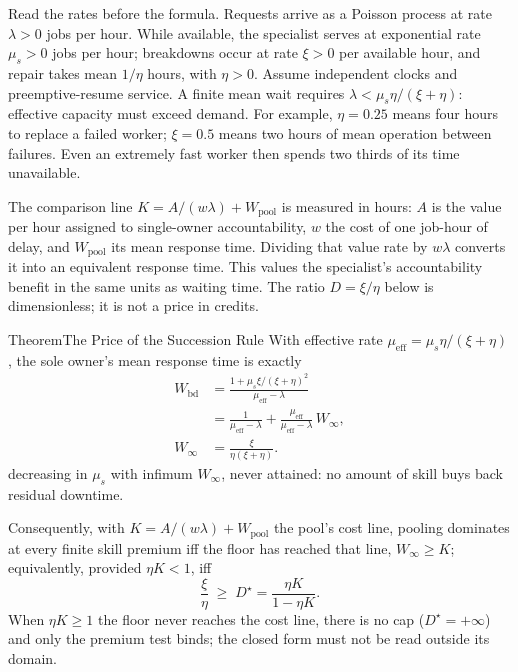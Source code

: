 \documentclass[11pt,a4paper]{article}
\theoremstyle{definition}
\theoremstyle{definition}
\theoremstyle{remark}
\begin{document}
Read the rates before the formula. Requests arrive as a Poisson process at
rate $\lambda>0$ jobs per hour. While available, the specialist serves at
exponential rate $\mu_s>0$ jobs per hour; breakdowns occur at rate $\xi>0$
per available hour, and repair takes mean $1/\eta$ hours, with $\eta>0$.
Assume independent clocks and preemptive-resume service. A finite mean wait
requires $\lambda<\mu_s\eta/(\xi+\eta)$: effective capacity must exceed demand.
For example, $\eta=0.25$ means four hours to replace a failed worker;
$\xi=0.5$ means two hours of mean operation between failures. Even an
extremely fast worker then spends two thirds of its time unavailable.

The comparison line $K=A/(w\lambda)+W_{\mathrm{pool}}$ is measured in hours:
$A$ is the value per hour assigned to single-owner accountability,
$w$ the cost of one job-hour of delay, and $W_{\mathrm{pool}}$ its mean response time. Dividing that value rate
by $w\lambda$ converts it into an equivalent response time.
This values the specialist's accountability benefit in the same units as
waiting time. The ratio $D=\xi/\eta$ below is dimensionless; it is not a price in credits.
\begin{pdclaim}{Theorem}{The Price of the Succession Rule}
\setlength{\parskip}{4pt plus 1pt}
\label{thm:succession-price}
With effective rate $\mu_{\mathrm{eff}}=\mu_s\eta/(\xi+\eta)$, the sole owner's
mean response time is exactly
\[
\begin{aligned}
W_{\mathrm{bd}}&=\frac{1+\mu_s\xi/(\xi+\eta)^2}{\mu_{\mathrm{eff}}-\lambda}\\[3pt]
&=\frac{1}{\mu_{\mathrm{eff}}-\lambda}+\frac{\mu_{\mathrm{eff}}}{\mu_{\mathrm{eff}}-\lambda}\,W_\infty,\\[3pt]
W_\infty&=\frac{\xi}{\eta(\xi+\eta)}.
\end{aligned}
\]
decreasing in $\mu_s$ with infimum $W_\infty$, never attained: no amount of
skill buys back residual downtime. 

Consequently, with
$K=A/(w\lambda)+W_{\mathrm{pool}}$ the pool's cost line, pooling dominates at
every finite skill premium iff the floor has reached that line,
$W_\infty\ge K$; equivalently, provided $\eta K<1$, iff
\[
\frac{\xi}{\eta}\;\ge\;D^\star=\frac{\eta K}{1-\eta K}.
\]
When $\eta K\ge1$ the floor never reaches the cost line, there is no cap
($D^\star=+\infty$) and only the premium test binds; the closed form must not
be read outside its domain.
\end{pdclaim}
\end{document}
